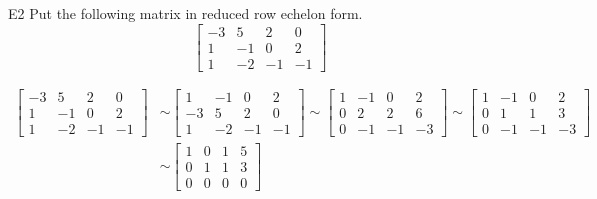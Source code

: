 \begin{problem}{E2}
Put the following matrix in reduced row echelon form.
$$\begin{bmatrix}-3 & 5 & 2 & 0 \\ 1 & -1 & 0 & 2 \\ 1 & -2 & -1 & -1 \end{bmatrix}$$
\end{problem}
\begin{solution}
\begin{align*}
\begin{bmatrix}
-3 & 5 & 2 & 0 \\
 1 & -1 & 0 & 2 \\
 1 & -2 & -1 & -1
\end{bmatrix} &\sim
\begin{bmatrix}
 1 & -1 & 0 & 2 \\
-3 & 5 & 2 & 0 \\
 1 & -2 & -1 & -1
\end{bmatrix} \sim
\begin{bmatrix}
 1 & -1 & 0 & 2 \\
 0 & 2 & 2 & 6 \\
 0 & -1 & -1 & -3
\end{bmatrix} \sim
\begin{bmatrix}
 1 & -1 & 0 & 2 \\
 0 & 1 & 1 & 3 \\
 0 & -1 & -1 & -3
\end{bmatrix} \\ &\sim
\begin{bmatrix}
 1 & 0 & 1 & 5 \\
 0 & 1 & 1 & 3 \\
 0 & 0 & 0 & 0
\end{bmatrix}
\end{align*}
\end{solution}

